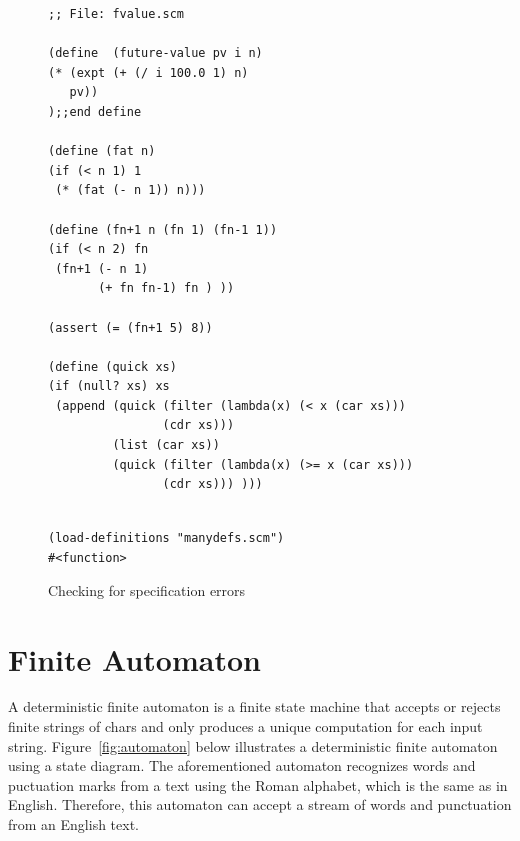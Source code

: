 \documentclass[a4paper,12pt]{book}
\newenvironment{fmpage}[1]
           {\begin{lrbox}{\fmbox}\begin{minipage}{#1}}
           {\end{minipage}\end{lrbox}\fbox{\usebox{\fmbox}}}
\begin{document}
\begin{figure}[!h]
\begin{fmpage}{0.9\textwidth}
\begin{verbatim}
;; File: fvalue.scm

(define  (future-value pv i n)
(* (expt (+ (/ i 100.0 1) n) 
   pv))
);;end define

(define (fat n)
(if (< n 1) 1
 (* (fat (- n 1)) n)))

(define (fn+1 n (fn 1) (fn-1 1))
(if (< n 2) fn
 (fn+1 (- n 1)
       (+ fn fn-1) fn ) ))

(assert (= (fn+1 5) 8))

(define (quick xs)
(if (null? xs) xs
 (append (quick (filter (lambda(x) (< x (car xs))) 
                (cdr xs)))
         (list (car xs))
         (quick (filter (lambda(x) (>= x (car xs)))
                (cdr xs))) )))


\end{verbatim}
\end{fmpage}

\begin{fmpage}{0.9\textwidth}
\verb|(load-definitions "manydefs.scm")|\\
\verb|#<function>|
\end{fmpage}
\caption{Checking for specification errors}
\label{debug-ready-source}
\end{figure}



\chapter{Finite Automaton}
\label{chap:finite-automaton}
A deterministic finite automaton
is a finite state machine that accepts or rejects
finite strings of chars and only produces
a unique computation  for each input string.
Figure~\ref{fig:automaton} below illustrates a deterministic
finite automaton using a state diagram.
The aforementioned automaton recognizes words
and puctuation marks from a text using
the Roman alphabet, which is the same
as in English. Therefore,
this automaton can  accept a
stream of words and punctuation from an English text.
\end{document}
